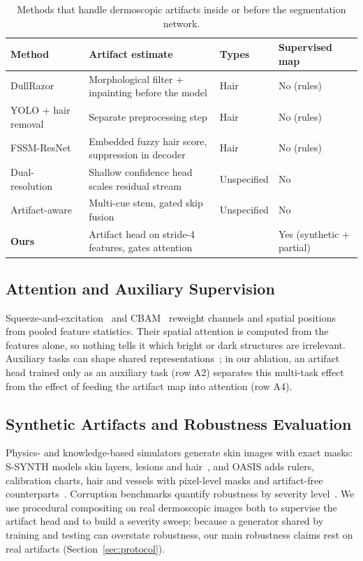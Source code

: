 \begin{table}[!t]
\centering
\caption{Methods that handle dermoscopic artifacts inside or before the segmentation network.}
\label{tab:related}
\footnotesize
\setlength{\tabcolsep}{3pt}
\begin{tabularx}{\columnwidth}{@{}>{\raggedright\arraybackslash}p{}>{\raggedright\arraybackslash}X>{\raggedright\arraybackslash}p{}>{\raggedright\arraybackslash}p{}@{}}
\toprule
Method & Artifact estimate & Types & Supervised map \\
\midrule
DullRazor~\cite{lee1997dullrazor} & Morphological filter + inpainting before the model & Hair & No (rules) \\
YOLO + hair removal~\cite{rana2025explainable} & Separate preprocessing step & Hair & No (rules) \\
FSSM-ResNet~\cite{raikhankyzy2026fssm} & Embedded fuzzy hair score, suppression in decoder & Hair & No (rules) \\
Dual-resolution~\cite{singh2025dualresolution} & Shallow confidence head scales residual stream & Unspecified & No \\
Artifact-aware~\cite{gong2026artifactaware} & Multi-cue stem, gated skip fusion & Unspecified & No \\
\textbf{Ours} & Artifact head on stride-4 features, gates attention & 4 & Yes (synthetic + partial) \\
\bottomrule
\end{tabularx}
\end{table}

\subsection{Attention and Auxiliary Supervision}
Squeeze-and-excitation~\cite{hu2018senet} and CBAM~\cite{woo2018cbam} reweight channels and spatial positions from pooled feature statistics. Their spatial attention is computed from the features alone, so nothing tells it which bright or dark structures are irrelevant. Auxiliary tasks can shape shared representations~\cite{caruana1997multitask}; in our ablation, an artifact head trained only as an auxiliary task (row A2) separates this multi-task effect from the effect of feeding the artifact map into attention (row A4).

\subsection{Synthetic Artifacts and Robustness Evaluation}
Physics- and knowledge-based simulators generate skin images with exact masks: S-SYNTH models skin layers, lesions and hair~\cite{kim2024ssynth}, and OASIS adds rulers, calibration charts, hair and vessels with pixel-level masks and artifact-free counterparts~\cite{sizikova2026oasis}. Corruption benchmarks quantify robustness by severity level~\cite{hendrycks2019benchmarking}. We use procedural compositing on real dermoscopic images both to supervise the artifact head and to build a severity sweep; because a generator shared by training and testing can overstate robustness, our main robustness claims rest on real artifacts (Section~\ref{sec:protocol}).
